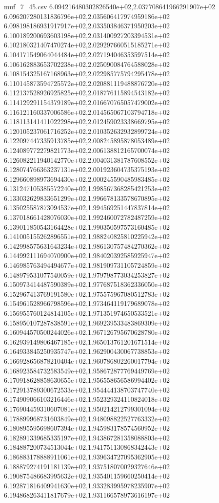 \begin{filecontents*}{muf_7_45.csv}
6.094216480302826540e+02,2.037708641966291907e+02
6.096207280131836796e+02,2.035606417974959186e+02
6.098198186931917917e+02,2.033503846371950203e+02
6.100189200693603198e+02,2.031400927203394531e+02
6.102180321407470274e+02,2.029297660515185271e+02
6.104171549064044484e+02,2.027194046353597514e+02
6.106162883653702238e+02,2.025090084764588028e+02
6.108154325167168963e+02,2.022985775794295478e+02
6.110145873594725572e+02,2.020881119488876720e+02
6.112137528926925825e+02,2.018776115894543182e+02
6.114129291154379189e+02,2.016670765057479002e+02
6.116121160337006586e+02,2.014565067103794718e+02
6.118113141411022298e+02,2.012459023338669795e+02
6.120105237061716252e+02,2.010352632932899724e+02
6.122097447335913785e+02,2.008245895878053489e+02
6.124089772279821773e+02,2.006138812165700074e+02
6.126082211940142770e+02,2.004031381787608552e+02
6.128074766363237131e+02,2.001923604735375193e+02
6.129660898973694430e+02,2.000245590485983485e+02
6.131247105385572240e+02,1.998567368285421253e+02
6.133032629833651299e+02,1.996678133578670895e+02
6.135025587873094537e+02,1.994569251447837814e+02
6.137018661428076030e+02,1.992460072782487259e+02
6.139011850543164428e+02,1.990350597573160485e+02
6.141005155262896551e+02,1.988240825810225942e+02
6.142998575631643234e+02,1.986130757484270362e+02
6.144992111694070900e+02,1.984020392585925947e+02
6.146985763494494677e+02,1.981909731105724859e+02
6.148979531077540059e+02,1.979798773034253827e+02
6.150973414487590389e+02,1.977687518362336050e+02
6.152967413769191580e+02,1.975575967080512783e+02
6.154961528966798596e+02,1.973464119179689078e+02
6.156955760124814105e+02,1.971351974650533521e+02
6.158950107287838591e+02,1.969239533483869309e+02
6.160944570500244026e+02,1.967126795670628780e+02
6.162939149806467185e+02,1.965013761201671514e+02
6.164933845250935747e+02,1.962900430067738853e+02
6.166928656878210404e+02,1.960786802260017794e+02
6.168923584732583549e+02,1.958672877769449769e+02
6.170918628858630655e+02,1.956558656586994402e+02
6.172913789300672533e+02,1.954444138703747740e+02
6.174909066103216446e+02,1.952329324110824018e+02
6.176904459310607081e+02,1.950214212799301094e+02
6.178899968731603849e+02,1.948098822527763332e+02
6.180895595698607394e+02,1.945983178574560952e+02
6.182891339685335197e+02,1.943867281358088803e+02
6.184887200734513044e+02,1.941751130868342443e+02
6.186883178888911061e+02,1.939634727095362905e+02
6.188879274191181139e+02,1.937518070029327646e+02
6.190875486683995632e+02,1.935401159660250414e+02
6.192871816409941630e+02,1.933283995978235907e+02
6.194868263411817679e+02,1.931166578973616197e+02

\end{filecontents*}
